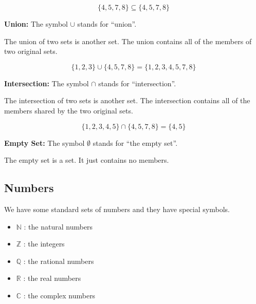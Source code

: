 \documentclass{ximera}
\begin{document}
\[
\{ 4, 5, 7, 8 \} \subseteq \{ 4, 5, 7, 8 \}
\]









\textbf{\textcolor{blue!55!black}{Union:}}  The symbol $\cup$ stands for ``union''.


The union of two sets is another set.  The union contains all of the members of two original sets.

\[
\{ 1, 2, 3 \} \cup \{ 4, 5, 7, 8 \} = \{ 1, 2, 3, 4, 5, 7, 8 \}
\]








\textbf{\textcolor{blue!55!black}{Intersection:}}  The symbol $\cap$ stands for ``intersection''.

The intersection of two sets is another set.  The intersection contains all of the members shared by the two original sets.

\[
\{ 1, 2, 3, 4, 5 \} \cap \{ 4, 5, 7, 8 \} = \{ 4, 5 \}
\]








\textbf{\textcolor{blue!55!black}{Empty Set:}}  The symbol $\emptyset$ stands for ``the empty set''.

The empty set is a set.  It just contains no members.














\subsection{Numbers}

We have some standard sets of numbers and they have special symbols. \\



\begin{itemize}

\item $\mathbb{N}$ : the natural numbers
\item $\mathbb{Z}$ : the integers
\item $\mathbb{Q}$ : the rational numbers
\item $\mathbb{R}$ : the real numbers
\item $\mathbb{C}$ : the complex numbers
\end{itemize}
\end{document}
